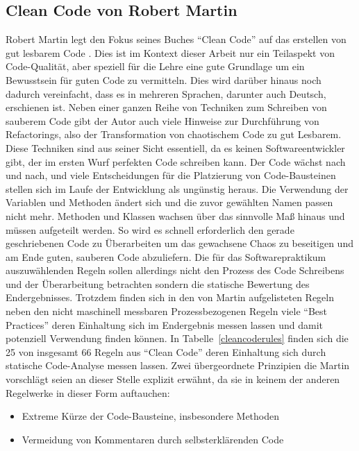 \documentclass[da,ngerman]{stthesis}
\begin{document}
			\subsection{Clean Code von Robert Martin} \label{cleancodechapter}
				Robert Martin legt den Fokus seines Buches "`Clean Code"' auf das erstellen von gut lesbarem Code \cite{CleanCode}. Dies ist im Kontext dieser Arbeit nur ein Teilaspekt von Code-Qualität, aber speziell für die Lehre eine gute Grundlage um ein Bewusstsein für guten Code zu vermitteln. Dies wird darüber hinaus noch dadurch vereinfacht, dass es in mehreren Sprachen, darunter auch Deutsch, erschienen ist. \newline
				Neben einer ganzen Reihe von Techniken zum Schreiben von sauberem Code gibt der Autor auch viele Hinweise zur Durchführung von Refactorings, also der Transformation von chaotischem Code zu gut Lesbarem. Diese Techniken sind aus seiner Sicht essentiell, da es keinen Softwareentwickler gibt, der im ersten Wurf perfekten Code schreiben kann. Der Code wächst nach und nach, und viele Entscheidungen für die Platzierung von Code-Bausteinen stellen sich im Laufe der Entwicklung als ungünstig heraus. Die Verwendung der Variablen und Methoden ändert sich und die zuvor gewählten Namen passen nicht mehr. Methoden und Klassen wachsen über das sinnvolle Maß hinaus und müssen aufgeteilt werden. So wird es schnell erforderlich den gerade geschriebenen Code zu Überarbeiten um das gewachsene Chaos zu beseitigen und am Ende guten, sauberen Code abzuliefern. \newline
				Die für das Softwarepraktikum auszuwählenden Regeln sollen allerdings nicht den Prozess des Code Schreibens und der Überarbeitung betrachten sondern die statische Bewertung des Endergebnisses. Trotzdem finden sich in den von Martin aufgelisteten Regeln neben den nicht maschinell messbaren Prozessbezogenen Regeln viele "`Best Practices"' deren Einhaltung sich im Endergebnis messen lassen und damit potenziell Verwendung finden können. In Tabelle~\ref{cleancoderules} finden sich die 25 von insgesamt 66 Regeln aus "`Clean Code"' deren Einhaltung sich durch statische Code-Analyse messen lassen. \newline
				Zwei übergeordnete Prinzipien die Martin vorschlägt seien an dieser Stelle explizit erwähnt, da sie in keinem der anderen Regelwerke in dieser Form auftauchen:
				\begin{itemize}
					\item Extreme Kürze der Code-Bausteine, insbesondere Methoden  
					\item Vermeidung von Kommentaren durch selbsterklärenden Code
				\end{itemize}
\end{document}
